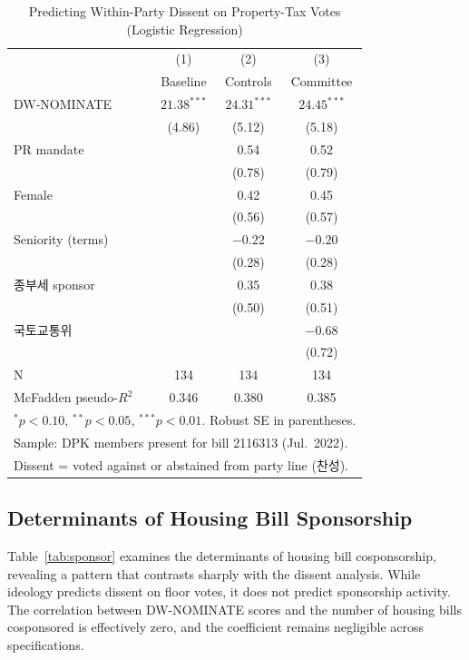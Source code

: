 \documentclass[11pt]{article}
\begin{document}
\begin{table}[H]
\centering
\caption{Predicting Within-Party Dissent on Property-Tax Votes (Logistic Regression)}
\label{tab:dissent}
\begin{tabular}{lccc}
\toprule
 & (1) & (2) & (3) \\
 & Baseline & Controls & Committee \\
\midrule
DW-NOMINATE & $21.38^{***}$ & $24.31^{***}$ & $24.45^{***}$ \\
 & (4.86) & (5.12) & (5.18) \\[4pt]
PR mandate &  & 0.54 & 0.52 \\
 &  & (0.78) & (0.79) \\[4pt]
Female &  & 0.42 & 0.45 \\
 &  & (0.56) & (0.57) \\[4pt]
Seniority (terms) &  & $-0.22$ & $-0.20$ \\
 &  & (0.28) & (0.28) \\[4pt]
종부세 sponsor &  & 0.35 & 0.38 \\
 &  & (0.50) & (0.51) \\[4pt]
국토교통위 &  &  & $-0.68$ \\
 &  &  & (0.72) \\
\midrule
N & 134 & 134 & 134 \\
McFadden pseudo-$R^2$ & 0.346 & 0.380 & 0.385 \\
\bottomrule
\multicolumn{4}{l}{\footnotesize $^{*}p<0.10$, $^{**}p<0.05$, $^{***}p<0.01$. Robust SE in parentheses.} \\
\multicolumn{4}{l}{\footnotesize Sample: DPK members present for bill 2116313 (Jul.\ 2022).} \\
\multicolumn{4}{l}{\footnotesize Dissent = voted against or abstained from party line (찬성).}
\end{tabular}
\end{table}


\subsection{Determinants of Housing Bill Sponsorship}

Table~\ref{tab:sponsor} examines the determinants of housing bill cosponsorship, revealing a pattern that contrasts sharply with the dissent analysis. While ideology predicts dissent on floor votes, it does not predict sponsorship activity. The correlation between DW-NOMINATE scores and the number of housing bills cosponsored is effectively zero, and the coefficient remains negligible across specifications.
\end{document}
